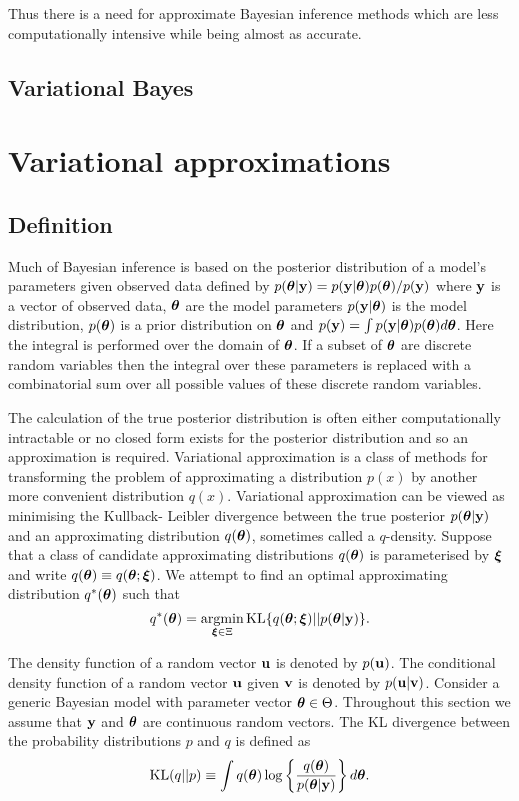 Thus there is a need for approximate Bayesian inference methods which are less computationally intensive while
being almost as accurate.

\subsection{Variational Bayes}
\section{Variational approximations}

\subsection{Definition}

Much of Bayesian inference is based on the posterior distribution of a model's parameters given observed data 
defined by $p({\boldsymbol \theta}|{\bf y}) = p({\bf y}|{\boldsymbol \theta})p({\boldsymbol \theta})/p({\bf y})$ where ${\bf y}$ is a vector of observed data,
${\boldsymbol \theta}$ are the model parameters $p({\bf y}|{\boldsymbol \theta})$ is the model distribution, $p({\boldsymbol \theta})$ is a prior 
distribution on ${\boldsymbol \theta}$ and $p({\bf y})=\int p({\bf y}|{\boldsymbol \theta})p({\boldsymbol \theta})d{\boldsymbol \theta}$. Here the integral is performed
over the domain of ${\boldsymbol \theta}$. If a subset of ${\boldsymbol \theta}$ are discrete random variables then the integral over
these parameters is replaced with a combinatorial sum over all possible values of these discrete random 
variables.

The calculation of the true posterior distribution is often either computationally intractable or no closed form
exists for the posterior distribution and so an approximation is required. Variational approximation is a
class of methods for transforming the problem of approximating a distribution $p(x)$ by another more
convenient distribution $q(x)$. Variational approximation can be viewed as minimising the Kullback- Leibler
divergence between the true posterior $p({\boldsymbol \theta}|{\bf y})$ and an approximating distribution $q({\boldsymbol \theta})$,
sometimes called a $q$-density. Suppose that a class of candidate approximating distributions
$q({\boldsymbol \theta})$ is parameterised by ${\boldsymbol \xi}$ and write $q({\boldsymbol \theta})\equiv q({\boldsymbol \theta};{\boldsymbol \xi})$. We attempt to find an 
optimal approximating distribution $q^*({\boldsymbol \theta})$ such that
\[
	\ds q^*(\vtheta) = \argmin_{\vxi \in \Xi} \text{KL} \{ {q(\vtheta;\vxi) || p(\vtheta|\vy)} \}.
\]

The density function of a random vector ${\bf u}$ is denoted by $p({\bf u})$.  The conditional density function of a
random vector ${\bf u}$ given ${\bf v}$ is denoted by $p({\bf u}|{\bf v})$. Consider a generic Bayesian model with parameter
vector ${\boldsymbol \theta} \in \Theta$. Throughout this section we assume that ${\bf y}$ and ${\boldsymbol \theta}$ are continuous random
vectors. The KL divergence between the probability distributions $p$ and $q$ is defined as
\[
	\text{KL}(q || p) \equiv \int q({\boldsymbol \theta}) \log \left \{ \frac{q({\boldsymbol \theta})}{p({\boldsymbol \theta} | {\bf y})} \right \} d {\boldsymbol \theta}.
\]

